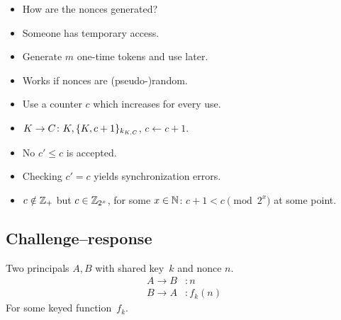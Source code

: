 \begin{frame}
  \begin{question}
    \begin{itemize}
      \item How are the nonces generated?
    \end{itemize}
  \end{question}

  \begin{example}
    \begin{itemize}
      \item Someone has temporary access.
      \item Generate \(m\) one-time tokens and use later.
      \item Works if nonces are (pseudo-)random.
    \end{itemize}
  \end{example}
\end{frame}

\begin{frame}
  \begin{example}
    \begin{itemize}
      \item Use a counter \(c\) which increases for every use.
      \item \(K\to C\colon K, \{K, c+1\}_{k_{K, C}}\), \(c\gets c+1\).
      \item No \(c' \leq c\) is accepted.
    \end{itemize}
  \end{example}

  \begin{remark}
    \begin{itemize}
      \item Checking \(c' = c\) yields synchronization errors.
      \item \(c\notin \operatorname{\mathbb{Z}}_+\) but \(c\in \operatorname{\mathbb{Z}}_{2^x}\), for some \(x\in \operatorname{\mathbb{N}}\): \ie 
        \(c+1 < c \pmod{2^x}\) at some point.
    \end{itemize}
  \end{remark}
\end{frame}

\subsection{Challenge--response}

\begin{frame}
  \begin{definition}
    Two principals \(A, B\) with shared key~\(k\) and nonce \(n\).
    \begin{align*}
      A\to B &\colon n \\
      B\to A &\colon f_k(n)
    \end{align*}
    For some keyed function~\(f_k\).
  \end{definition}
\end{frame}

